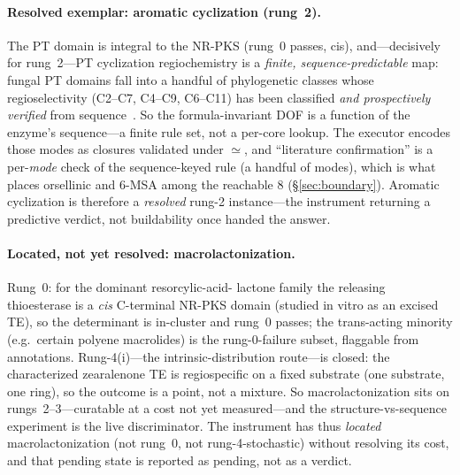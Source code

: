 \documentclass[11pt]{article}
\begin{document}
\paragraph{Resolved exemplar: aromatic cyclization (rung~2).} The PT domain is integral to the NR-PKS
(rung~0 passes, cis), and---decisively for rung~2---PT cyclization regiochemistry is a \emph{finite,
sequence-predictable} map: fungal PT domains fall into a handful of phylogenetic classes whose
regioselectivity (C2--C7, C4--C9, C6--C11) has been classified \emph{and prospectively verified} from
sequence~\citep{ptregio}. So the formula-invariant DOF is a function of the enzyme's sequence---a
finite rule set, not a per-core lookup. The executor encodes those modes as closures validated under
$\simeq$, and ``literature confirmation'' is a per-\emph{mode} check of the sequence-keyed rule (a
handful of modes), which is what places orsellinic and 6-MSA among the reachable $8$
(\S\ref{sec:boundary}). Aromatic cyclization is therefore a \emph{resolved} rung-2 instance---the
instrument returning a predictive verdict, not buildability once handed the answer.

\paragraph{Located, not yet resolved: macrolactonization.} Rung~0: for the dominant resorcylic-acid-
lactone family the releasing thioesterase is a \emph{cis} C-terminal NR-PKS domain (studied in vitro
as an excised TE), so the determinant is in-cluster and rung~0 passes; the trans-acting minority
(e.g.\ certain polyene macrolides) is the rung-0-failure subset, flaggable from annotations. Rung-4(i)---the
intrinsic-distribution route---is closed: the characterized zearalenone TE is regiospecific on a fixed
substrate (one substrate, one ring), so the outcome is a point, not a mixture. So macrolactonization sits on rungs~2--3---curatable at a cost not yet
measured---and the structure-vs-sequence experiment is the live discriminator. The instrument has thus
\emph{located} macrolactonization (not rung~0, not rung-4-stochastic) without resolving its cost, and
that pending state is reported as pending, not as a verdict.

\end{document}
